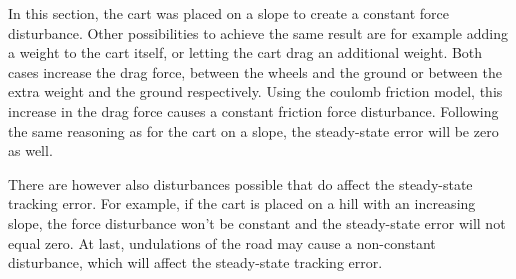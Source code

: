 \documentclass[a4paper,kul]{kulakarticle} %
\begin{document}
In this section, the cart was placed on a slope to create a constant force disturbance. Other possibilities to achieve the same result are for example adding a weight to the cart itself, or letting the cart drag an additional weight. Both cases increase the drag force, between the wheels and the ground or between the extra weight and the ground respectively. Using the coulomb friction model, this increase in the drag force causes a constant friction force disturbance. Following the same reasoning as for the cart on a slope, the steady-state error will be zero as well. 

There are however also disturbances possible that do affect the steady-state tracking error. For example, if the cart is placed on a hill with an increasing slope, the force disturbance won't be constant and the steady-state error will not equal zero. At last, undulations of the road may cause a non-constant disturbance, which will affect the steady-state tracking error. 




\end{document}
